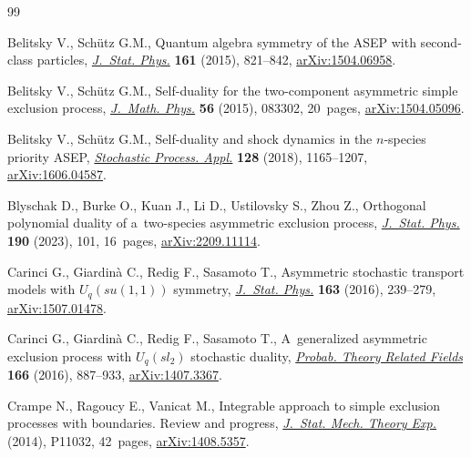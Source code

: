 \documentclass[10pt,a4paper]{amsart}
\numberwithin{equation}{section}
\theoremstyle{definition}
\def\mathcal#1{#1}
\def\mathfrak#1{#1}
\begin{document}
\vspace{-1mm}


\begin{thebibliography}{99}
\footnotesize\itemsep=0pt

Belitsky V., Sch\"utz G.M., Quantum algebra symmetry of the {ASEP} with
 second-class particles,
 \href{https://doi.org/10.1007/s10955-015-1363-1}{\textit{J.~Stat. Phys.}}
 \textbf{161} (2015), 821--842,
 \href{https://arxiv.org/abs/1504.06958}{arXiv:1504.06958}.

Belitsky V., Sch\"utz G.M., Self-duality for the two-component asymmetric
 simple exclusion process,
 \href{https://doi.org/10.1063/1.4929663}{\textit{J.~Math. Phys.}} \textbf{56}
 (2015), 083302, 20~pages,
 \href{https://arxiv.org/abs/1504.05096}{arXiv:1504.05096}.

Belitsky V., Sch\"utz G.M., Self-duality and shock dynamics in the
 {$n$}-species priority {ASEP},
 \href{https://doi.org/10.1016/j.spa.2017.07.003}{\textit{Stochastic Process.
 Appl.}} \textbf{128} (2018), 1165--1207,
 \href{https://arxiv.org/abs/1606.04587}{arXiv:1606.04587}.

Blyschak D., Burke O., Kuan J., Li D., Ustilovsky S., Zhou Z., Orthogonal
 polynomial duality of a~two-species asymmetric exclusion process,
 \href{https://doi.org/10.1007/s10955-023-03100-y}{\textit{J.~Stat. Phys.}}
 \textbf{190} (2023), 101, 16~pages,
 \href{https://arxiv.org/abs/2209.11114}{arXiv:2209.11114}.

Carinci G., Giardin\`a C., Redig F., Sasamoto T., Asymmetric stochastic
 transport models with {$\mathcal{U}_q(\mathfrak{su}(1,1))$} symmetry,
 \href{https://doi.org/10.1007/s10955-016-1473-4}{\textit{J.~Stat. Phys.}}
 \textbf{163} (2016), 239--279,
 \href{https://arxiv.org/abs/1507.01478}{arXiv:1507.01478}.

Carinci G., Giardin\`a C., Redig F., Sasamoto T., A~generalized asymmetric
 exclusion process with {$U_q(\mathfrak{sl}_2)$} stochastic duality,
 \href{https://doi.org/10.1007/s00440-015-0674-0}{\textit{Probab. Theory
 Related Fields}} \textbf{166} (2016), 887--933,
 \href{https://arxiv.org/abs/1407.3367}{arXiv:1407.3367}.

Crampe N., Ragoucy E., Vanicat M., Integrable approach to simple exclusion
 processes with boundaries. {R}eview and progress,
 \href{https://doi.org/10.1088/1742-5468/2014/11/p11032}{\textit{J.~Stat.
 Mech. Theory Exp.}} (2014), P11032, 42~pages,
 \href{https://arxiv.org/abs/1408.5357}{arXiv:1408.5357}.


\end{thebibliography}
\end{document}
